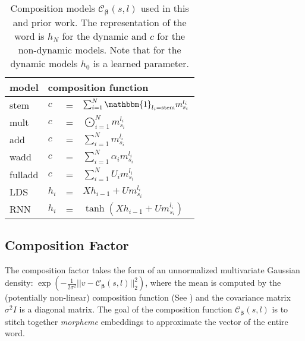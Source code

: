 \documentclass[11pt,letterpaper]{article}
\renewcommand{\vec}{\boldsymbol}
\newcommand{\vbeta}{{\vec{\beta}}}
\begin{document}

\begin{table}
  \setlength{\extrarowheight}{5pt}
  \begin{tabular}{l|lll}
    model & \multicolumn{3}{l}{composition function} \\ \hline
    {stem} & $c$ & = & $\sum_{i=1}^N \mathbbm{1}_{l_i = \text{stem}} m^{l_i}_{s_i}$ \\
    {mult} & $c$ & = &$\bigodot_{i=1}^N m^{l_i}_{s_i}$ \\
    {add} & $c$ & = &$\sum_{i=1}^N m^{l_i}_{s_i}$ \\
    {wadd} & $c$ & = &$\sum_{i=1}^N \alpha_i 
m^{l_i}_{s_i}$ \\
    {fulladd} & $c$ & = &$\sum_{i=1}^N U_i 
m^{l_i}_{s_i}$ \\
    {LDS}  & $h_i$& =& $X h_{i-1} + U m^{l_i}_{s_i}$\\
    {RNN} & $h_i$ &=& $\tanh(X h_{i-1} + U m^{l_i}_{s_i})$
  \end{tabular}
  \caption{Composition models $\mathcal{C}_{\vbeta}(s, l)$
    used in this and prior work. The representation of
    the word is 
$h_{N}$ for the dynamic 
and $c$ for the non-dynamic models.
  Note that for the dynamic models $h_0$ is a learned parameter.}
\end{table}



\subsection{Composition Factor}
The composition factor takes the form of an unnormalized multivariate Gaussian
density: $\exp\left(-\frac{1}{2\sigma^2}||v -
\mathcal{C}_{\vbeta}(s, l)||_2^2\right)$, where the mean is computed
by the (potentially non-linear) composition function 
(See )
and the
covariance matrix $\sigma^2I$ is a diagonal matrix.  The goal of the composition
function $\mathcal{C}_{\vbeta}(s, l)$ is to stitch together {\em
  morpheme} embeddings to approximate the vector of the entire word.
\end{document}
